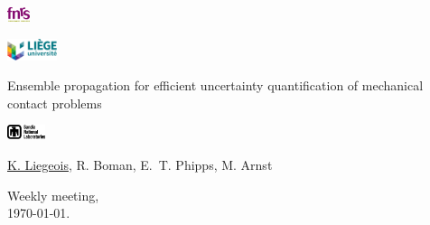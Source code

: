 
\begin{frame}

\vspace{10pt}

\begin{mybox}
\begin{center}
\parbox{.06\textwidth}{\includegraphics[height=12pt]{logos/FNRS.eps}}
\parbox{.13\textwidth}{\includegraphics[height=18pt]{logos/uLIEGE.eps}}
\parbox{.54\textwidth}{\centering \scriptsize Ensemble propagation for efficient uncertainty quantification of mechanical contact problems}
\parbox{.19\textwidth}{\hspace{20pt}\includegraphics[height=12pt]{logos/sandia.eps}}
{ \tiny \underline{K. Liegeois}, R. Boman, E.~T. Phipps, M. Arnst}
\end{center}
\end{mybox}

\vspace{-10pt}
\begin{center}
\end{center}

\begin{center}
Weekly meeting,\\
\today.
\end{center}
\end{frame}